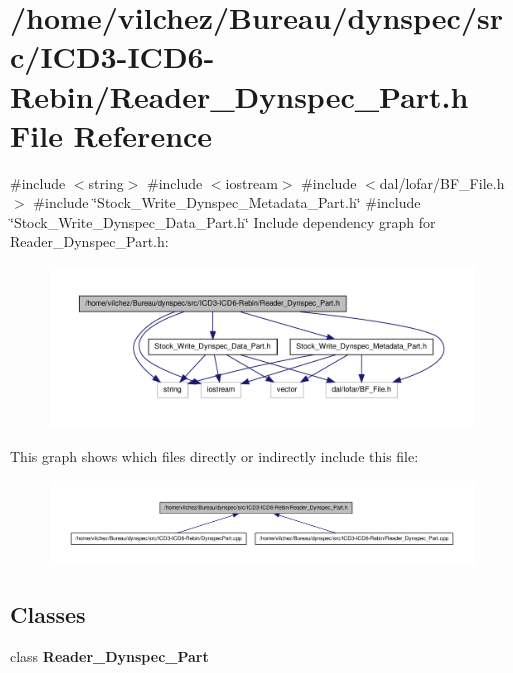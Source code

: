 \section{/home/vilchez/\-Bureau/dynspec/src/\-I\-C\-D3-\/\-I\-C\-D6-\/\-Rebin/\-Reader\-\_\-\-Dynspec\-\_\-\-Part.h \-File \-Reference}
\label{_reader___dynspec___part_8h}
{\ttfamily \#include $<$string$>$}\*
{\ttfamily \#include $<$iostream$>$}\*
{\ttfamily \#include $<$dal/lofar/\-B\-F\-\_\-\-File.\-h$>$}\*
{\ttfamily \#include \char`\"{}\-Stock\-\_\-\-Write\-\_\-\-Dynspec\-\_\-\-Metadata\-\_\-\-Part.\-h\char`\"{}}\*
{\ttfamily \#include \char`\"{}\-Stock\-\_\-\-Write\-\_\-\-Dynspec\-\_\-\-Data\-\_\-\-Part.\-h\char`\"{}}\*
\-Include dependency graph for \-Reader\-\_\-\-Dynspec\-\_\-\-Part.\-h\-:\nopagebreak
\begin{figure}[H]
\begin{center}
\leavevmode
\includegraphics[width=350pt]{_reader___dynspec___part_8h__incl}
\end{center}
\end{figure}
\-This graph shows which files directly or indirectly include this file\-:\nopagebreak
\begin{figure}[H]
\begin{center}
\leavevmode
\includegraphics[width=350pt]{_reader___dynspec___part_8h__dep__incl}
\end{center}
\end{figure}
\subsection*{\-Classes}
\begin{DoxyCompactItemize}
\item 
class {\bf \-Reader\-\_\-\-Dynspec\-\_\-\-Part}
\end{DoxyCompactItemize}
